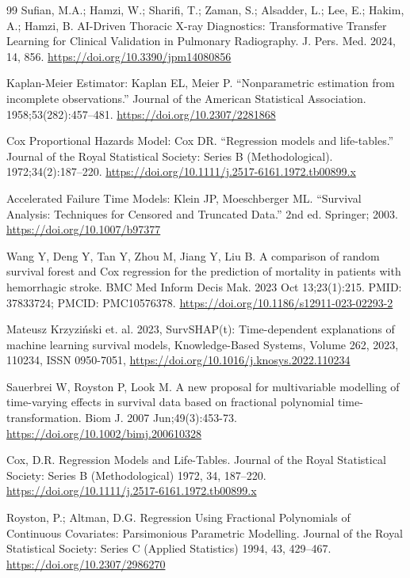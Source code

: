 \documentclass[a4paper,12pt]{article}
\begin{document}
\begin{thebibliography}{99}
 Sufian, M.A.; Hamzi, W.; Sharifi, T.; Zaman, S.; Alsadder, L.; Lee, E.; Hakim, A.; Hamzi, B. AI-Driven Thoracic X-ray Diagnostics: Transformative Transfer Learning for Clinical Validation in Pulmonary Radiography. J. Pers. Med. 2024, 14, 856. 
\url{https://doi.org/10.3390/jpm14080856}


 Kaplan-Meier Estimator: Kaplan EL, Meier P. “Nonparametric estimation from incomplete observations.” Journal of the American Statistical Association. 1958;53(282):457–481.
\url{https://doi.org/10.2307/2281868}

 Cox Proportional Hazards Model: Cox DR. “Regression models and life-tables.” Journal of the Royal Statistical Society: Series B (Methodological). 1972;34(2):187–220.
\url{ https://doi.org/10.1111/j.2517-6161.1972.tb00899.x}

 Accelerated Failure Time Models: Klein JP, Moeschberger ML. “Survival Analysis: Techniques for Censored and Truncated Data.” 2nd ed. Springer; 2003.
\url{https://doi.org/10.1007/b97377}


  Wang Y, Deng Y, Tan Y, Zhou M, Jiang Y, Liu B. A comparison of random survival forest and Cox regression for the prediction of mortality in patients with hemorrhagic stroke. BMC Med Inform Decis Mak. 2023 Oct 13;23(1):215. PMID: 37833724; PMCID: PMC10576378.
\url{https://doi.org/10.1186/s12911-023-02293-2}

  Mateusz Krzyziński et. al. 2023,  SurvSHAP(t): Time-dependent explanations of machine learning survival models, Knowledge-Based Systems, Volume 262, 2023, 110234, ISSN 0950-7051,
\url{https://doi.org/10.1016/j.knosys.2022.110234}


  Sauerbrei W, Royston P, Look M. A new proposal for multivariable modelling of time-varying effects in survival data based on fractional polynomial time-transformation. Biom J. 2007 Jun;49(3):453-73. \url{https://doi.org/10.1002/bimj.200610328}


 Cox, D.R. Regression Models and Life-Tables. Journal of the Royal Statistical Society: Series B (Methodological) 1972, 34, 187–220. \url{https://doi.org/10.1111/j.2517-6161.1972.tb00899.x}


 Royston, P.; Altman, D.G. Regression Using Fractional Polynomials of Continuous Covariates: Parsimonious Parametric Modelling. Journal of the Royal Statistical Society: Series C (Applied Statistics) 1994, 43, 429–467. \url{https://doi.org/10.2307/2986270}



\end{thebibliography}
\end{document}
